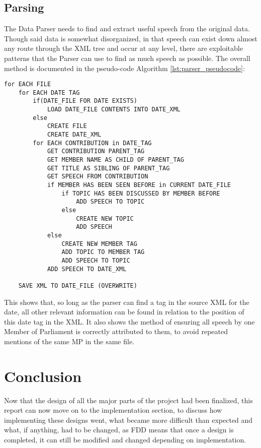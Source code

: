 \subsection{Parsing}
\label{sec:des_Parsing_algorithm}
The Data Parser needs to find and extract useful speech from the original data. Though said data is somewhat disorganized, in that speech can exist down almost any route through the XML tree and occur at any level, there are exploitable patterns that the Parser can use to find as much speech as possible. The overall method is documented in the pseudo-code Algorithm \ref{lst:parser_pseudocode}:
\begin{lstlisting}[float=ht, caption={Data Parser Pseudo-code}, label={lst:parser_pseudocode}]
for EACH FILE
    for EACH DATE TAG
    	if(DATE_FILE FOR DATE EXISTS)
        	LOAD DATE_FILE CONTENTS INTO DATE_XML
    	else
        	CREATE FILE
        	CREATE DATE_XML
    	for EACH CONTRIBUTION in DATE_TAG
        	GET CONTRIBUTION PARENT_TAG
        	GET MEMBER NAME AS CHILD OF PARENT_TAG
        	GET TITLE AS SIBLING OF PARENT_TAG
        	GET SPEECH FROM CONTRIBUTION
        	if MEMBER HAS BEEN SEEN BEFORE in CURRENT DATE_FILE
        	    if TOPIC HAS BEEN DISCUSSED BY MEMBER BEFORE
        			ADD SPEECH TO TOPIC
        		else
        			CREATE NEW TOPIC
        			ADD SPEECH
        	else
        		CREATE NEW MEMBER TAG
        		ADD TOPIC TO MEMBER TAG
        		ADD SPEECH TO TOPIC
        	ADD SPEECH TO DATE_XML

    SAVE XML TO DATE_FILE (OVERWRITE)
\end{lstlisting}

This shows that, so long as the parser can find a tag in the source XML for the date, all other relevant information can be found in relation to the position of this date tag in the XML. It also shows the method of ensuring all speech by one Member of Parliament is correctly attributed to them, to avoid repeated mentions of the same MP in the same file.

\section{Conclusion}
Now that the design of all the major parts of the project had been finalized, this report can now move on to the implementation section, to discuss how implementing these designs went, what became more difficult than expected and what, if anything, had to be changed, as FDD means that once a design is completed, it can still be modified and changed depending on implementation.